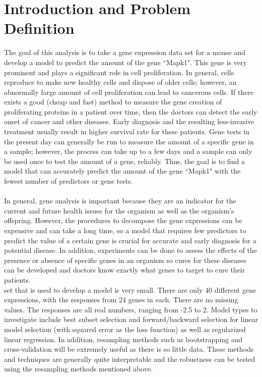 \documentclass{article}
\begin{document}
\section{Introduction and Problem Definition}
The goal of this analysis is to take a gene expression data set for a mouse and develop a model to predict the amount of the gene ``Mapk1".  This gene is very prominent and plays a significant role in cell proliferation.  In general, cells reproduce to make new healthy cells and dispose of older cells; however, an abnormally large amount of cell proliferation can lead to cancerous cells.  If there exists a good (cheap and fast) method to measure the gene creation of proliferating proteins in a patient over time, then the doctors can detect the early onset of cancer and other diseases.  Early diagnosis and the resulting less-invasive treatment usually result in higher survival rate for these patients.  Gene tests in the present day can generally be run to measure the amount of a specific gene in a sample; however, the process can take up to a few days and a sample can only be used once to test the amount of a gene, reliably.  Thus, the goal is to find a model that can accurately predict the amount of the gene  ``Mapk1" with the fewest number of predictors or gene tests.\\
\null\\
%
In general, gene analysis is important because they are an indicator for the current and future health issues for the organism as well as the organism's offspring.  However, the procedures to decompose the gene expressions can be expensive and can take a long time, so a model that requires few predictors to predict the value of a certain gene is crucial for accurate and early diagnosis for a potential disease.  In addition, experiments can be done to assess the effects of the presence or absence of specific genes in an organism so cures for these diseases can be developed and doctors know exactly what genes to target to cure their patients.\\
 set that is used to develop a model is very small.  There are only 40 different gene expressions, with the responses from 24 genes
in each.  There are no missing values.  The responses are all real numbers, ranging from -2.5 to 2.  Model types to investigate include best subset selection and forward/backward selection for linear model selection (with squared error as the loss function) as well as regularized linear regression.  In addition, resampling methods such as bootstrapping and cross-validation will be extremely useful as there is so little data.  These methods and techniques are generally quite interpretable and the robustness can be tested using the resampling methods mentioned above.\\
\end{document}
